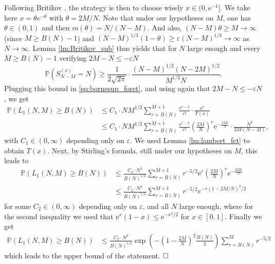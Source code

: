 \documentclass[a4, 11pt]{article}
\numberwithin{equation}{section}
\theoremstyle{plain}
\theoremstyle{definition}
\theoremstyle{remark}
\begin{document}
Following Britikov  \cite{britikov88}, the strategy is then to choose wisely $x\in (0,\mathrm{e}^{-1}]$. We take here $x=\theta e^{-\theta}$ with $\theta=2M/N$. Note that under our hypotheses on $M$, one has $\theta\in (0,1)$ and then $m(\theta)=N/(N-M)$.  And also,
$(N-M)\theta \geq M\to \infty$ (since $M\geq B(N)-1$) and $\left(N-M\right)^{1/3}\left(1-\theta\right)\geq  \varepsilon\left(N-M\right)^{1/3}\to \infty$ as $N \rightarrow \infty$.
Lemma \ref{lm:Britikov_sub} thus yields that for  $N$ large enough and every $M \geq B(N)-1$ verifying $2M-N\leq -\varepsilon N$ 
\begin{equation*}\label{eq:equiv_marche}
	\mathbb{P}\left(S_{N-M}^{(x)}=N\right)\geq\frac{1}{2\sqrt{2\pi}}\cdot \frac{(N-M)^{1/2}(N-2M)^{1/2}}{M^{1/2}N}.
\end{equation*}   
Plugging this bound in \eqref{eq:bornesup_foret}, and using again that $2M-N\leq -\varepsilon N$, we get
\begin{align*}
\mathbb{P}\left( L_1(N,M)\geq B(N)\right)&\leq C_1\cdot N M^{1/2}
\sum_{r=B(N)}^{M+1}\frac{r^{r-2}}{r!} \cdot \frac{x^r}{T(x)}\\
&\leq C_1\cdot N M^{1/2} \sum_{r=B(N)}^{M+1}\frac{r^{r-2}}{r!}\left(\frac{2M}{N}\right)^r \mathrm{e}^{-\frac{2Mr}{N}} \cdot \frac{N^2}{2M(N-M)},
\end{align*}
with $C_1\in (0,\infty)$ depending only on $\varepsilon$. We used Lemma \ref{lm:lambert_fct} to obtain $T(x)$. Next, by Stirling's formula, still under our hypotheses on $M$, this leads to 
\begin{align*}
	\mathbb{P}\left(L_1(N,M) \geq B(N)\right) &\leq \frac{C_2\cdot N^{2}}{B(N)^{1/2}} \sum_{r=B(N)}^{M+1} r^{-5/2}\mathrm{e}^{r}\left(\frac{2M}{N}\right)^r \mathrm{e}^{-\frac{2Mr}{N}} \\
	&\leq  \frac{C_2\cdot N^{2}}{B(N)^{1/2}} \sum_{r=B(N)}^{M+1} r^{-5/2} e^{-r(1-2M/N)^2/2}
\end{align*}
for some $C_2 \in (0,\infty)$ depending only on $\varepsilon$, and all $N$ large enough, where for the second inequality we used that $\mathrm{e}^x(1-x)\leq \mathrm{e}^{-x^2/2}$ for $x\in [0,1]$.  
Finally we get 
\begin{align*}
\mathbb{P}\left(L_1(N,M) \geq B(N)\right) &\leq \frac{C_2\cdot N^{2}}{B(N)^{1/2}}\exp\left(-\left(1-\frac{2M}{N}\right)^2\frac{B(N)}{2}\right)\sum_{r=B(N)}^{M}r^{-5/2}
\end{align*}
which leads to the upper bound of the statement. $\hfill \square$

\bigskip
\end{document}
